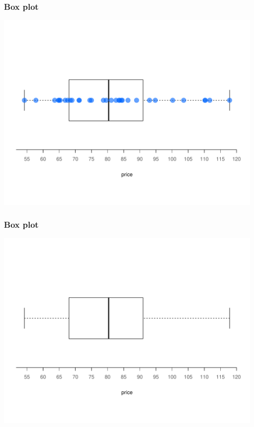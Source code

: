 \documentclass[12pt]{beamer}\usepackage[]{graphicx}\usepackage[]{color}
\newenvironment{knitrout}{}{} %
\begin{document}

\begin{frame}[fragile]
\frametitle{Box plot}
\begin{knitrout}\footnotesize
{}\color{fgcolor}

{\centering \includegraphics[width=.9\linewidth,height=.7\linewidth]{figure/unnamed-chunk-24-1} 

}



\end{knitrout}

\end{frame}


\begin{frame}[fragile]
\frametitle{Box plot}
\begin{knitrout}\footnotesize
{}\color{fgcolor}

{\centering \includegraphics[width=.9\linewidth,height=.7\linewidth]{figure/unnamed-chunk-25-1} 

}



\end{knitrout}

\end{frame}
\end{document}
